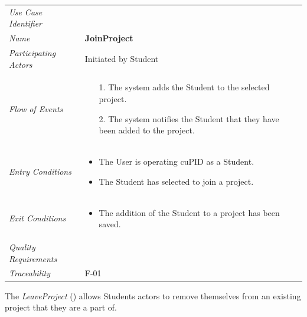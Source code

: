 \documentclass[12pt,letterpaper]{article}
\begin{document}
\begin{center}
	\begin{tabu} to 
		\toprule
		Use Case Identifier &  \\
		Name & {\bf JoinProject} \\
		Participating Actors & Initiated by Student \\
		Flow of Events & 
		\begin{minipage}[t]{\linewidth}
		    \begin{enumerate}
				\item[1.] The system adds the Student to the selected project.
				\item[2.] The system notifies the Student that they have been added to the project.
			\end{enumerate}
		\end{minipage} \\

		Entry Conditions &
		\begin{minipage}[t]{\linewidth}
			\begin{itemize}
			    \item The User is operating cuPID as a Student.
			    \item The Student has selected to join a project.
	        \end{itemize}
		\end{minipage} \\

		Exit Conditions &
		\begin{minipage}[t]{\linewidth}
			\begin{itemize}
			    \item The addition of the Student to a project has been saved.
	        \end{itemize}
		\end{minipage} \\

		Quality Requirements & \\

		Traceability & F-01 \\
		\toprule
	\end{tabu}
\end{center}

\vspace{1em}
The {\it LeaveProject} () allows Students actors to remove themselves from an existing project that they are a part of.
\end{document}
